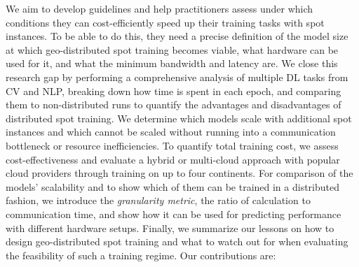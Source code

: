 We aim to develop guidelines and help practitioners assess under which conditions they can cost-efficiently speed up their training tasks with spot instances.
To be able to do this, they need a precise definition of the model size at which geo-distributed spot training becomes viable, what hardware can be used for it, and what the minimum bandwidth and latency are.
We close this research gap by performing a comprehensive analysis of multiple DL tasks from CV and NLP, breaking down how time is spent in each epoch, and comparing them to non-distributed runs to quantify the advantages and disadvantages of distributed spot training.
We determine which models scale with additional spot instances and which cannot be scaled without running into a communication bottleneck or resource inefficiencies.
To quantify total training cost, we assess cost-effectiveness and evaluate a hybrid or multi-cloud approach with popular cloud providers through training on up to four continents.
For comparison of the models' scalability and to show which of them can be trained in a distributed fashion, we introduce the \textit{granularity metric}, the ratio of calculation to communication time, and show how it can be used for predicting performance with different hardware setups.
Finally, we summarize our lessons on how to design geo-distributed spot training and what to watch out for when evaluating the feasibility of such a training regime. Our contributions are:
